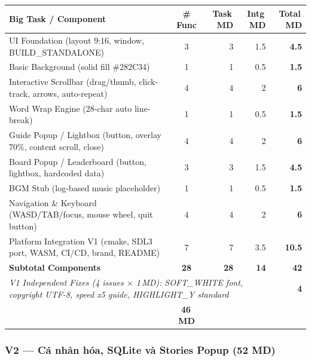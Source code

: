 \documentclass[12pt,a4paper]{article}
\begin{document}
\begin{tabularx}{\linewidth}{|X|c|r|r|r|}
\hline
\rowcolor{consoleOrange!18}
\textbf{Big Task / Component} & \textbf{\# Func} & \textbf{Task\,MD} & \textbf{Intg\,MD} & \textbf{Total\,MD} \\
\hline
\rowcolor{rowLight}
UI Foundation (layout 9:16,
window, BUILD\_STANDALONE) & 3 & 3 & 1.5 & \textbf{4.5} \\
Basic Background (solid fill \#282C34) & 1 & 1 & 0.5 & \textbf{1.5} \\
\rowcolor{rowLight}
Interactive Scrollbar (drag/thumb, click-track, arrows, auto-repeat) & 4 & 4 & 2 & \textbf{6} \\
Word Wrap Engine (28-char auto line-break) & 1 & 1 & 0.5 & \textbf{1.5} \\
\rowcolor{rowLight}
Guide Popup / Lightbox (button, overlay 70\%, content scroll, close) & 4 & 4 & 2 & \textbf{6} \\
Board Popup / Leaderboard (button, lightbox, hardcoded data) & 3 & 3 & 1.5 & \textbf{4.5} \\
\rowcolor{rowLight}
BGM Stub (log-based music placeholder) & 1 & 1 & 0.5 & \textbf{1.5} \\
Navigation \&
Keyboard (WASD/TAB/focus, mouse wheel, quit button) & 4 & 4 & 2 & \textbf{6} \\
\rowcolor{rowLight}
Platform Integration V1 (cmake, SDL3 port, WASM, CI/CD, brand, README) & 7 & 7 & 3.5 & \textbf{10.5} \\
\hline
\rowcolor{consoleOrange!12}
\textbf{Subtotal Components} & \textbf{28} & \textbf{28} & \textbf{14} & \textbf{42} \\
\hline
\multicolumn{4}{|p{0.82\linewidth}|}{\raggedright \textit{V1 Independent Fixes (4 issues $\times$ 1\,MD): SOFT\_WHITE font, copyright UTF-8, speed x5 guide, HIGHLIGHT\_Y standard}} & \textbf{4} \\
\hline
\rowcolor{v1green!15}
\multicolumn{4}{|l|}{\textbf{V1 Grand Total}} & \textbf{46\,MD} \\
\hline
\end{tabularx}

\subsubsection{V2 — Cá nhân hóa, SQLite và Stories Popup (52 MD)}
\end{document}
